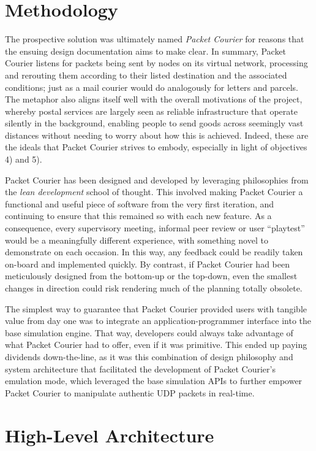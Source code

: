 \section{Methodology}

The prospective solution was ultimately named \emph{Packet Courier} for reasons that the ensuing design documentation
aims to make clear. In summary, Packet Courier listens for packets being sent by nodes on its virtual network,
processing and rerouting them according to their listed destination and the associated conditions; just as a mail
courier would do analogously for letters and parcels. The metaphor also aligns itself well with the overall
motivations of the project, whereby postal services are largely seen as reliable infrastructure that operate silently
in the background, enabling people to send goods across seemingly vast distances without needing to worry about how
this is achieved. Indeed, these are the ideals that Packet Courier strives to embody, especially in light of
objectives 4) and 5).

Packet Courier has been designed and developed by leveraging philosophies from the \emph{lean development} school of
thought\cite{william_feld_lean_book, steve_blank_lean_blog}. This involved making Packet Courier a functional and
useful piece of software from the very first iteration, and continuing to ensure that this remained so with each new
feature. As a consequence, every supervisory meeting, informal peer review or user ``playtest'' would be a
meaningfully different experience, with something novel to demonstrate on each occasion. In this way, any feedback
could be readily taken on-board and implemented quickly. By contrast, if Packet Courier had been meticulously
designed from the bottom-up or the top-down, even the smallest changes in direction could risk rendering much of the
planning totally obsolete.

The simplest way to guarantee that Packet Courier provided users with tangible value from day one was to integrate an
application-programmer interface into the base simulation engine. That way, developers could always take advantage of
what Packet Courier had to offer, even if it was primitive. This ended up paying dividends down-the-line, as it was this
combination of design philosophy and system architecture that facilitated the development of Packet Courier's
emulation mode, which leveraged the base simulation APIs to further empower Packet Courier to manipulate authentic
UDP packets in real-time.


\section{High-Level Architecture}

